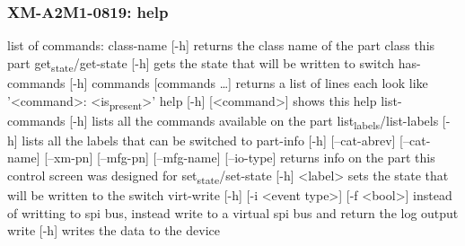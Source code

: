 \documentclass[11pt]{article}
\begin{document}
\subsubsection{XM-A2M1-0819: help}
\label{sec:orgd684014}
list of commands:
  class-name [-h]
    returns the class name of the part class this part
  get\textsubscript{state}/get-state [-h]
    gets the state that will be written to switch
  has-commands [-h] commands [commands \ldots{}]
    returns a list of lines each look like '<command>: <is\textsubscript{present}>'
  help [-h] [<command>]
    shows this help
  list-commands [-h]
    lists all the commands available on the part
  list\textsubscript{labels}/list-labels [-h]
    lists all the labels that can be switched to
  part-info  [-h] [--cat-abrev] [--cat-name] [--xm-pn] [--mfg-pn] [--mfg-name]
          [--io-type]
    returns info on the part this control screen was designed for
  set\textsubscript{state}/set-state [-h] <label>
    sets the state that will be written to the switch
  virt-write [-h] [-i <event type>] [-f <bool>]
    instead of writting to spi bus, instead write to a virtual spi bus
    and return the log output
  write [-h]
    writes the data to the device
\end{document}
